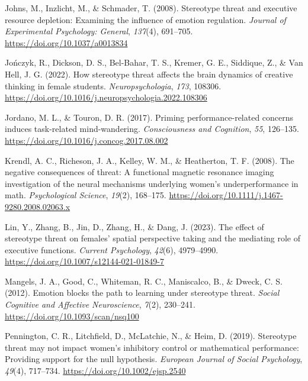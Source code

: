 \documentclass[
  doc, a4paper]{apa7}
\newlength{\cslhangindent}
\newenvironment{CSLReferences}[2] %
 {\begin{list}{}{%
  \setlength{\itemindent}{0pt}
  \setlength{\leftmargin}{0pt}
  \setlength{\parsep}{0pt}
  \ifodd #1
   \setlength{\leftmargin}{\cslhangindent}
   \setlength{\itemindent}{-1\cslhangindent}
  \fi
  \setlength{\itemsep}{#2\baselineskip}}}
 {\end{list}}
\begin{document}
\begin{CSLReferences}{1}{0}
Johns, M., Inzlicht, M., \& Schmader, T. (2008). Stereotype threat and executive resource depletion: {Examining} the influence of emotion regulation. \emph{Journal of Experimental Psychology: General}, \emph{137}(4), 691--705. \url{https://doi.org/10.1037/a0013834}

Jończyk, R., Dickson, D. S., Bel-Bahar, T. S., Kremer, G. E., Siddique, Z., \& Van Hell, J. G. (2022). How stereotype threat affects the brain dynamics of creative thinking in female students. \emph{Neuropsychologia}, \emph{173}, 108306. \url{https://doi.org/10.1016/j.neuropsychologia.2022.108306}

Jordano, M. L., \& Touron, D. R. (2017). Priming performance-related concerns induces task-related mind-wandering. \emph{Consciousness and Cognition}, \emph{55}, 126--135. \url{https://doi.org/10.1016/j.concog.2017.08.002}

Krendl, A. C., Richeson, J. A., Kelley, W. M., \& Heatherton, T. F. (2008). The negative consequences of threat: A functional magnetic resonance imaging investigation of the neural mechanisms underlying women's underperformance in math. \emph{Psychological Science}, \emph{19}(2), 168--175. \url{https://doi.org/10.1111/j.1467-9280.2008.02063.x}

Lin, Y., Zhang, B., Jin, D., Zhang, H., \& Dang, J. (2023). The effect of stereotype threat on females' spatial perspective taking and the mediating role of executive functions. \emph{Current Psychology}, \emph{42}(6), 4979--4990. \url{https://doi.org/10.1007/s12144-021-01849-7}

Mangels, J. A., Good, C., Whiteman, R. C., Maniscalco, B., \& Dweck, C. S. (2012). Emotion blocks the path to learning under stereotype threat. \emph{Social Cognitive and Affective Neuroscience}, \emph{7}(2), 230--241. \url{https://doi.org/10.1093/scan/nsq100}

Pennington, C. R., Litchfield, D., McLatchie, N., \& Heim, D. (2019). Stereotype threat may not impact women's inhibitory control or mathematical performance: {Providing} support for the null hypothesis. \emph{European Journal of Social Psychology}, \emph{49}(4), 717--734. \url{https://doi.org/10.1002/ejsp.2540}


\end{CSLReferences}
\end{document}
